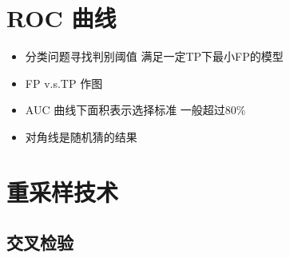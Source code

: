 \documentclass[
]{book}
\providecommand{\tightlist}{%
  \setlength{\itemsep}{0pt}\setlength{\parskip}{0pt}}
\begin{document}
\hypertarget{roc-ux66f2ux7ebf}{%
\section{ROC 曲线}\label{roc-ux66f2ux7ebf}}

\begin{itemize}
\tightlist
\item
  分类问题寻找判别阈值 满足一定TP下最小FP的模型
\item
  FP v.s.TP 作图
\item
  AUC 曲线下面积表示选择标准 一般超过80\%
\item
  对角线是随机猜的结果
\end{itemize}

\hypertarget{ux91cdux91c7ux6837ux6280ux672f}{%
\section{重采样技术}\label{ux91cdux91c7ux6837ux6280ux672f}}

\hypertarget{ux4ea4ux53c9ux68c0ux9a8c}{%
\subsection{交叉检验}\label{ux4ea4ux53c9ux68c0ux9a8c}}
\end{document}
